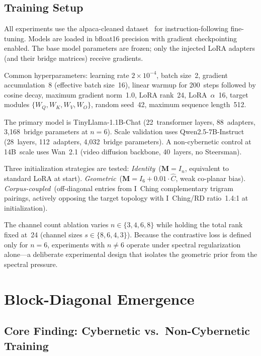 \documentclass[11pt]{article}
\begin{document}
\subsection{Training Setup}
\label{sec:setup}

All experiments use the alpaca-cleaned dataset~\cite{alpaca} for
instruction-following fine-tuning. Models are loaded in bfloat16
precision with gradient checkpointing enabled. The base model
parameters are frozen; only the injected LoRA adapters (and their
bridge matrices) receive gradients.

Common hyperparameters: learning rate $2 \times 10^{-4}$, batch
size~2, gradient accumulation~8 (effective batch size~16), linear
warmup for 200~steps followed by cosine decay, maximum gradient
norm~1.0, LoRA rank~24, LoRA~$\alpha$~16, target modules
$\{W_Q, W_K, W_V, W_O\}$, random seed~42, maximum sequence
length~512.

The primary model is TinyLlama-1.1B-Chat (22~transformer layers,
88~adapters, 3{,}168~bridge parameters at $n = 6$). Scale validation
uses Qwen2.5-7B-Instruct (28~layers, 112~adapters, 4{,}032~bridge
parameters). A non-cybernetic control at 14B~scale uses Wan~2.1
(video diffusion backbone, 40~layers, no Steersman).

Three initialization strategies are tested:
\emph{Identity}~($\mathbf{M} = I_n$, equivalent to standard LoRA at
start).
\emph{Geometric}~($\mathbf{M} = I_6 + 0.01 \cdot \hat{C}$, weak
co-planar bias).
\emph{Corpus-coupled}~(off-diagonal entries from I~Ching
complementary trigram pairings, actively opposing the target topology
with I~Ching/RD ratio~1.4:1 at initialization).

The channel count ablation varies $n \in \{3, 4, 6, 8\}$ while
holding the total rank fixed at~24 (channel sizes
$s \in \{8, 6, 4, 3\}$). Because the contrastive loss is defined only
for $n = 6$, experiments with $n \neq 6$ operate under spectral
regularization alone---a deliberate experimental design that isolates
the geometric prior from the spectral pressure.


\section{Block-Diagonal Emergence}
\label{sec:emergence}

\subsection{Core Finding: Cybernetic vs.\ Non-Cybernetic Training}
\end{document}
